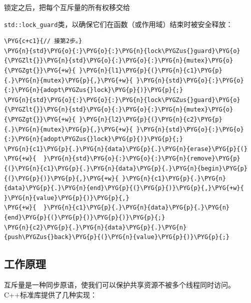 
锁定之后，把每个互斥量的所有权移交给



\texttt{std::\allowbreak{}lock\_\allowbreak{}guard}类，以确保它们在函数（或作用域）结束时被安全释放：



\begin{codeblockbg}
\begin{Verbatim}[commandchars=\\\{\},breaklines=true,breakanywhere=true,fontsize=\codefont,xleftmargin=17bp]
\PYG{c+c1}{// 接第2步。}
\PYG{n}{std}\PYG{o}{:}\PYG{o}{:}\PYG{n}{lock\PYGZus{}guard}\PYG{o}{\PYGZlt{}}\PYG{n}{std}\PYG{o}{:}\PYG{o}{:}\PYG{n}{mutex}\PYG{o}{\PYGZgt{}}\PYG{+w}{ }\PYG{n}{l1}\PYG{p}{(}\PYG{n}{c1}\PYG{p}{.}\PYG{n}{mutex}\PYG{p}{,}\PYG{+w}{ }\PYG{n}{std}\PYG{o}{:}\PYG{o}{:}\PYG{n}{adopt\PYGZus{}lock}\PYG{p}{)}\PYG{p}{;}
\PYG{n}{std}\PYG{o}{:}\PYG{o}{:}\PYG{n}{lock\PYGZus{}guard}\PYG{o}{\PYGZlt{}}\PYG{n}{std}\PYG{o}{:}\PYG{o}{:}\PYG{n}{mutex}\PYG{o}{\PYGZgt{}}\PYG{+w}{ }\PYG{n}{l2}\PYG{p}{(}\PYG{n}{c2}\PYG{p}{.}\PYG{n}{mutex}\PYG{p}{,}\PYG{+w}{ }\PYG{n}{std}\PYG{o}{:}\PYG{o}{:}\PYG{n}{adopt\PYGZus{}lock}\PYG{p}{)}\PYG{p}{;}
\PYG{n}{c1}\PYG{p}{.}\PYG{n}{data}\PYG{p}{.}\PYG{n}{erase}\PYG{p}{(}
\PYG{+w}{  }\PYG{n}{std}\PYG{o}{:}\PYG{o}{:}\PYG{n}{remove}\PYG{p}{(}\PYG{n}{c1}\PYG{p}{.}\PYG{n}{data}\PYG{p}{.}\PYG{n}{begin}\PYG{p}{(}\PYG{p}{)}\PYG{p}{,}\PYG{+w}{ }\PYG{n}{c1}\PYG{p}{.}\PYG{n}{data}\PYG{p}{.}\PYG{n}{end}\PYG{p}{(}\PYG{p}{)}\PYG{p}{,}\PYG{+w}{ }\PYG{n}{value}\PYG{p}{)}\PYG{p}{,}
\PYG{+w}{  }\PYG{n}{c1}\PYG{p}{.}\PYG{n}{data}\PYG{p}{.}\PYG{n}{end}\PYG{p}{(}\PYG{p}{)}\PYG{p}{)}\PYG{p}{;}
\PYG{n}{c2}\PYG{p}{.}\PYG{n}{data}\PYG{p}{.}\PYG{n}{push\PYGZus{}back}\PYG{p}{(}\PYG{n}{value}\PYG{p}{)}\PYG{p}{;}
\end{Verbatim}
\end{codeblockbg}



\subsection{工作原理}



互斥量是一种同步原语，使我们可以保护共享资源不被多个线程同时访问。C++标准库提供了几种实现：


